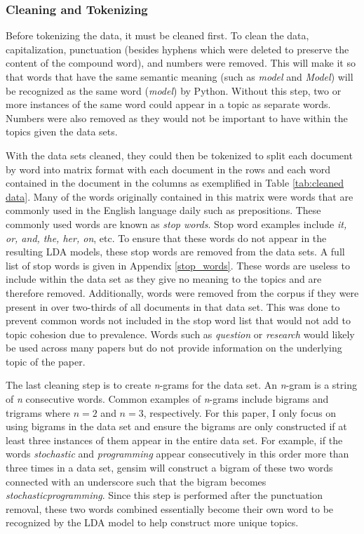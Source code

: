 \documentclass[a4paper, 12pt, twoside]{article}
\numberwithin{equation}{section} %
\begin{document}
\subsubsection{Cleaning and Tokenizing} 

Before tokenizing the data, it must be cleaned first. To clean the data, capitalization, punctuation (besides hyphens which were deleted to preserve the content of the compound word), and numbers were removed. This will make it so that words that have the same semantic meaning (such as \textit{model} and \textit{Model}) will be recognized as the same word (\textit{model}) by Python. Without this step, two or more instances of the same word could appear in a topic as separate words. Numbers were also removed as they would not be important to have within the topics given the data sets. 

With the data sets cleaned, they could then be tokenized to split each document by word into matrix format with each document in the rows and each word contained in the document in the columns as exemplified in Table \ref{tab:cleaned data}. Many of the words originally contained in this matrix were words that are commonly used in the English language daily such as prepositions. These commonly used words are known as \textit{stop words}. Stop word examples include \textit{it, or, and, the, her, on}, etc. To ensure that these words do not appear in the resulting LDA models, these stop words are removed from the data sets. A full list of stop words is given in Appendix \ref{stop_words}. These words are useless to include within the data set as they give no meaning to the topics and are therefore removed. Additionally, words were removed from the corpus if they were present in over two-thirds of all documents in that data set. This was done to prevent common words not included in the stop word list that would not add to topic cohesion due to prevalence. Words such as \textit{question} or \textit{research}  would likely be used across many papers but do not provide information on the underlying topic of the paper. 	

The last cleaning step is to create \textit{n}-grams for the data set. An \textit{n}-gram is a string of \textit{n} consecutive words. Common examples of \textit{n}-grams include bigrams and trigrams where $n=2$ and $n=3$, respectively. For this paper, I only focus on using bigrams in the data set and ensure the bigrams are only constructed if at least three instances of them appear in the entire data set. For example, if the words \textit{stochastic} and \textit{programming} appear consecutively in this order more than three times in a data set, gensim will construct a bigram of these two words connected with an underscore such that the bigram becomes \textit{stochastic\textunderscore programming}. Since this step is performed after the punctuation removal, these two words combined essentially become their own word to be recognized by the LDA model to help construct more unique topics. 
\end{document}
